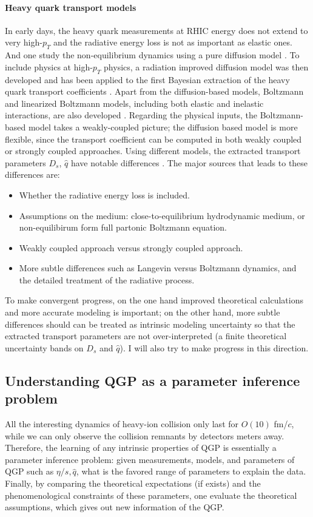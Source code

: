 \paragraph{Heavy quark transport models}
In early days, the heavy quark measurements at RHIC energy does not extend to very high-$p_T$ and the radiative energy loss is not as important as elastic ones.
And one study the non-equilibrium dynamics using a pure diffusion model \cite{Moore:2004tg,vanHees:2007me}. 
To include physics at high-$p_T$ physics, a radiation improved diffusion model was then developed \cite{Cao:2013ita} and has been applied to the first Bayesian extraction of the heavy quark transport coefficients \cite{Xu:2017obm}.
Apart from the diffusion-based models, Boltzmann and linearized Boltzmann models, including both elastic and inelastic interactions, are also developed \cite{Scardina:2017ipo,Cao:2017hhk,Ke:2018tsh}.
Regarding the physical inputs, the Boltzmann-based model takes a weakly-coupled picture; the diffusion based model is more flexible, since the transport coefficient can be computed in both weakly coupled or strongly coupled approaches.
Using different models, the extracted transport parameters $D_s$, $\hat{q}$ have notable differences \cite{Rapp:2018qla,PhysRevC.99.014902,Cao:2018ews}.
The major sources that leads to these differences are:
\begin{itemize}
\item Whether the radiative energy loss is included.
\item Assumptions on the medium: close-to-equilibrium hydrodynamic medium, or non-equilibirum form full partonic Boltzmann equation.
\item Weakly coupled approach versus strongly coupled approach.
\item More subtle differences such as Langevin versus Boltzmann dynamics, and the detailed treatment of the radiative process.
\end{itemize}
To make convergent progress, on the one hand improved theoretical calculations and more accurate modeling is important; on the other hand, more subtle differences should can be treated as intrinsic modeling uncertainty so that the extracted transport parameters are not over-interpreted (a finite theoretical uncertainty bands on $D_s$ and $\hat{q}$). 
I will also try to make progress in this direction.

\subsection{Understanding QGP as a parameter inference problem}
All the interesting dynamics of heavy-ion collision only last for $O(10) $ fm/$c$, while we can only observe the collision remnants by detectors meters away.
Therefore, the learning of any intrinsic properties of QGP is essentially  a parameter inference problem:
given measurements, models, and parameters of QGP such as $\eta/s, \hat{q}$, what is the favored range of parameters to explain the data.
Finally, by comparing the theoretical expectations (if exists) and the phenomenological constraints of these parameters, one evaluate the theoretical assumptions, which gives out new information of the QGP.

